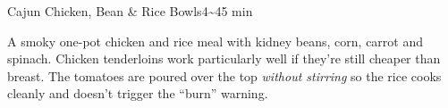 

\begin{recipebox}{Cajun Chicken, Bean \& Rice Bowls}{4}{\textasciitilde45 min}

A smoky one-pot chicken and rice meal with kidney beans, corn, carrot and
spinach. Chicken tenderloins work particularly well if they're still cheaper
than breast. The tomatoes are poured over the top \emph{without stirring} so
the rice cooks cleanly and doesn't trigger the ``burn'' warning.


\end{recipebox}

